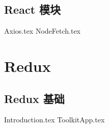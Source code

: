 \documentclass{PionpillNote-book}
\begin{document}
\chapter{React 模块}
{Axios.tex}
{NodeFetch.tex}
\part{Redux}
\chapter{Redux 基础}
{Introduction.tex}
{ToolkitApp.tex}
\end{document}
